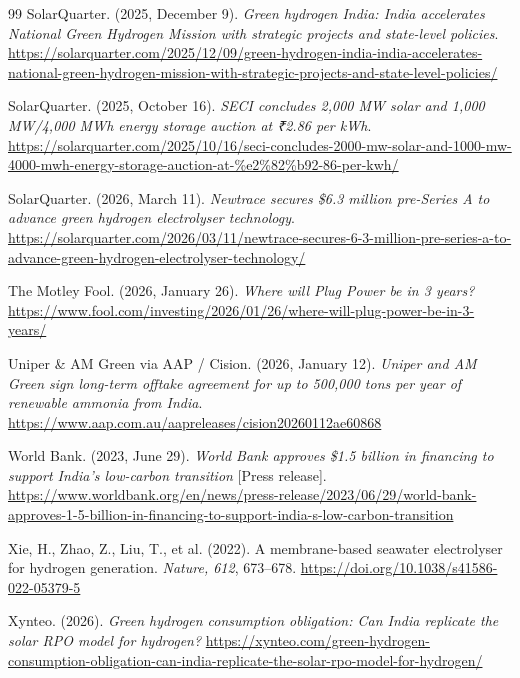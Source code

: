 {\begin{thebibliography}{99}
 SolarQuarter. (2025, December 9). \emph{Green hydrogen India: India accelerates National Green Hydrogen Mission with strategic projects and state-level policies}. \url{https://solarquarter.com/2025/12/09/green-hydrogen-india-india-accelerates-national-green-hydrogen-mission-with-strategic-projects-and-state-level-policies/}

 SolarQuarter. (2025, October 16). \emph{SECI concludes 2,000 MW solar and 1,000 MW/4,000 MWh energy storage auction at ₹2.86 per kWh}. \url{https://solarquarter.com/2025/10/16/seci-concludes-2000-mw-solar-and-1000-mw-4000-mwh-energy-storage-auction-at-%e2%82%b92-86-per-kwh/}

 SolarQuarter. (2026, March 11). \emph{Newtrace secures \$6.3 million pre-Series A to advance green hydrogen electrolyser technology}. \url{https://solarquarter.com/2026/03/11/newtrace-secures-6-3-million-pre-series-a-to-advance-green-hydrogen-electrolyser-technology/}

 The Motley Fool. (2026, January 26). \emph{Where will Plug Power be in 3 years?} \url{https://www.fool.com/investing/2026/01/26/where-will-plug-power-be-in-3-years/}

 Uniper \& AM Green via AAP / Cision. (2026, January 12). \emph{Uniper and AM Green sign long-term offtake agreement for up to 500,000 tons per year of renewable ammonia from India}. \url{https://www.aap.com.au/aapreleases/cision20260112ae60868}

 World Bank. (2023, June 29). \emph{World Bank approves \$1.5 billion in financing to support India's low-carbon transition} [Press release]. \url{https://www.worldbank.org/en/news/press-release/2023/06/29/world-bank-approves-1-5-billion-in-financing-to-support-india-s-low-carbon-transition}

 Xie, H., Zhao, Z., Liu, T., et al. (2022). A membrane-based seawater electrolyser for hydrogen generation. \emph{Nature, 612}, 673–678. \url{https://doi.org/10.1038/s41586-022-05379-5}

 Xynteo. (2026). \emph{Green hydrogen consumption obligation: Can India replicate the solar RPO model for hydrogen?} \url{https://xynteo.com/green-hydrogen-consumption-obligation-can-india-replicate-the-solar-rpo-model-for-hydrogen/}

\end{thebibliography}
}
